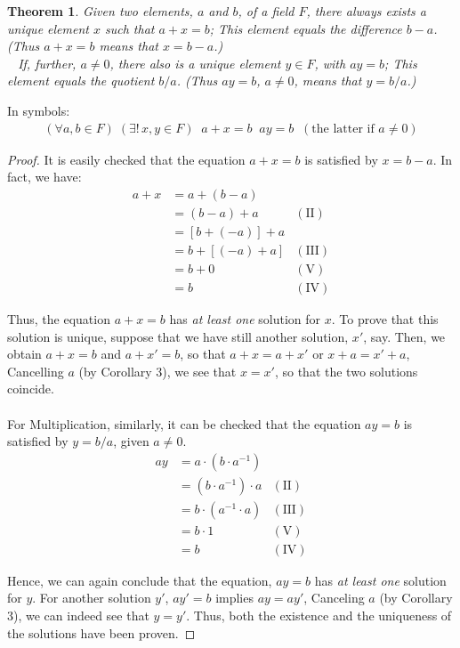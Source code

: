 \documentclass[12pt]{book}
\newtheorem{theorem}{Theorem}
\theoremstyle{definition}
\begin{document}
\begin{theorem} 
Given two elements, $a$ and $b$, of a field $F$, there always exists a unique element $x$ such that $a+x =b$; This element equals the difference $b-a$.\\
(Thus $a+x =b$ means that $x=b-a$.)\\\
\indent
If, further, $a\neq 0$, there also is a unique element $y \in F$, with $ay=b$; This element equals the quotient $b/a$. (Thus $ay=b$, $a\neq0$, means that $y =b/a$.)    
\end{theorem}
In symbols:
\begin{align*}
(\forall a,b \in F)\;(\exists! \, x,y \in F ) \;\;a+x =b \;\; ay =b \;\; (\text{the latter if $a\neq 0$}) 	
\end{align*}
\begin{proof}
It is easily checked that the equation $a+x=b$ is satisfied by $x=b-a$. In fact, we have:
\begin{align*}
a+x &= a+(b-a)\\
&= (b-a)+a  	&(\text{II})\\
&= [b+(-a)]+a \\
&= b+[(-a)+a]  &(\text{III})\\
&= b+ 0  &(\text{V})\\
&= b &(\text{IV})
\end{align*}

Thus, the equation $a+x=b$ has \textit{at least one} solution for $x$. To prove that this solution is unique, suppose that we have still another solution, $x'$, say. Then, we obtain $a+x=b$ and $a+x'=b$, so that $a+x=a+x'$ or $x+a=x'+a$, Cancelling $a$ (by Corollary 3), we see that $x=x'$, so that the two solutions coincide.\\ \\
\indent 
For Multiplication, similarly, it can be checked that the equation $ay=b$ is satisfied by $y=b/a$, given $a\neq0$. 
\begin{align*}
ay &=a \cdot (b\cdot a^{-1}) \\
&= 	(b\cdot a^{-1}) \cdot a &(\text{II})\\
&= 	b\cdot (a^{-1}\cdot a) &(\text{III})\\
&= b\cdot 1 & (\text{V})\\
&= b &(\text{IV})
\end{align*}

Hence, we can again conclude that the equation, $ay=b$ has \textit{at least one} solution for $y$. For another solution $y'$, $ay'=b$ implies $ay= ay'$, Canceling $a$ (by Corollary 3), we can indeed see that $y=y'$.
Thus, both the existence and the uniqueness of the solutions have been proven.       
\end{proof}
\end{document}
